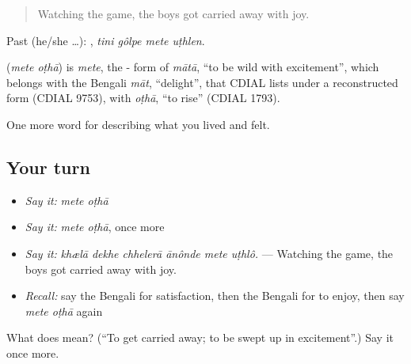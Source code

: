 \begin{quote}
Watching the game, the boys got carried away with joy.
\end{quote}

Past (he/she …):    , \emph{tini gôlpe mete uṭhlen}.

\begin{cousinweb}
\textbf{ } (\emph{mete oṭhā}) is \emph{mete}, the - form of \emph{mātā}, \textquotedblleft{}to be wild with excitement\textquotedblright{}, which belongs with the Bengali \emph{māt}, \textquotedblleft{}delight\textquotedblright{}, that CDIAL lists under a reconstructed form (CDIAL 9753), with \emph{oṭhā}, \textquotedblleft{}to rise\textquotedblright{} (CDIAL 1793).
\end{cousinweb}

\begin{grammarlens}[title={What you've built}]
One more word for describing what you lived and felt.
\end{grammarlens}

\subsection*{Your turn}
\begin{itemize}
\raggedright
  \item \emph{Say it:} \emph{mete oṭhā}
  \item \emph{Say it:} \emph{mete oṭhā}, once more
  \item \emph{Say it:} \emph{khælā dekhe chhelerā ānônde mete uṭhlô.} — Watching the game, the boys got carried away with joy.
  \item \emph{Recall:} say the Bengali for satisfaction, then the Bengali for to enjoy, then say \emph{mete oṭhā} again
\end{itemize}

\begin{tcolorbox}[breakable,colback=teal!4,colframe=teal!35!black,title={Before you move on}]
What does   mean? (\textquotedblleft{}To get carried away; to be swept up in excitement\textquotedblright{}.) Say it once more.
\end{tcolorbox}
